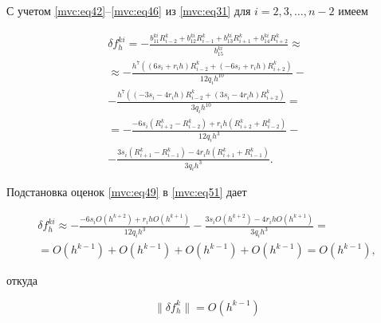 С учетом \eqref{mvc:eq42}--\eqref{mvc:eq46} из \eqref{mvc:eq31} для $i=2,  3,  \dots,  n-2$ имеем 

\begin{multline}

\label{mvc:eq51}

   \delta f_{h}^{ki}=

-\frac{b_{11}^{ki} R_{i-2}^k+b_{12}^{ki} R_{i-1}^k+b_{13}^{ki} R_{i+1}^k+b_{14}^{ki} R_{i+2}^k}{b_{15}^{ki}}\approx

\\

\approx-\frac{h^7\left((6s_i+r_ih) R_{i-2}^k+(-6s_i+r_ih) R_{i+2}^k\right)}{12q_ih^{10}}-

\\

-\frac{h^7\left((-3s_i-4r_ih) R_{i-2}^k+(3s_i-4r_ih) R_{i+2}^k\right)}{3q_ih^{10}}=

\\

=-\frac{-6s_i(R_{i+2}^k-R_{i-2}^k)+r_ih(R_{i+2}^k+R_{i-2}^k)}{12q_ih^{3}}-

\\

-\frac{3s_i(R_{i+1}^k-R_{i-1}^k)-4r_ih(R_{i+1}^k+R_{i-1}^k)}{3q_ih^{3}}.

\end{multline}



Подстановка оценок \eqref{mvc:eq49} в \eqref{mvc:eq51} дает

\begin{multline}

\label{mvc:eq52}

   \delta f_{h}^{ki}

\approx-\frac{-6s_i O (h^{k+2})+r_ih O(h^{k+1})}{12q_ih^{3}}-


\frac{3s_i O(h^{k+2})-4r_ih O(h^{k+1})}{3q_ih^{3}}=

\\

=O(h^{k-1})+O(h^{k-1})+O(h^{k-1})+O(h^{k-1})=O(h^{k-1})

,

\end{multline}

откуда

\begin{equation}

\label{mvc:eq52A}

\|\delta f_h^k\|=O(h^{k-1})

\end{equation}

